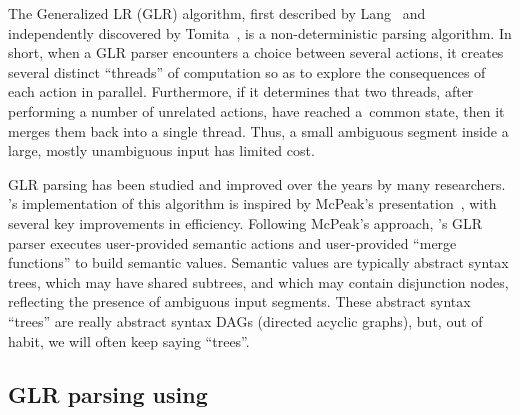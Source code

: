 The Generalized LR (GLR) algorithm, first described by Lang~\cite{lang-74}
and independently discovered by Tomita~\cite{tomita-85},
is a non-deterministic parsing algorithm.
In short, when a GLR parser encounters a choice between several
actions, it creates several distinct ``threads'' of computation
so as to explore the consequences of each action in parallel.
Furthermore, if it determines that two threads, after performing
a number of unrelated actions, have reached a~common state, then
it merges them back into a single thread. Thus, a small ambiguous
segment inside a large, mostly unambiguous input has limited cost.

GLR parsing has been studied and improved over the years by many
researchers. \menhir's implementation of this algorithm is inspired
by McPeak's presentation~\cite{mcpeak-02,mcpeak-necula-04}, with
several key improvements in efficiency. Following McPeak's approach,
\menhir's GLR parser executes user-provided semantic actions and
user-provided ``merge functions'' to build semantic values.
Semantic values are typically
abstract syntax trees, which may have shared subtrees,
and which may contain disjunction nodes,
reflecting the presence of ambiguous input segments.
%
These abstract syntax ``trees'' are really abstract syntax DAGs
(directed acyclic graphs), but, out of habit, we will often keep
saying ``trees''.



\subsection{GLR parsing using \menhir}
\label{sec:GLR:menhir}

